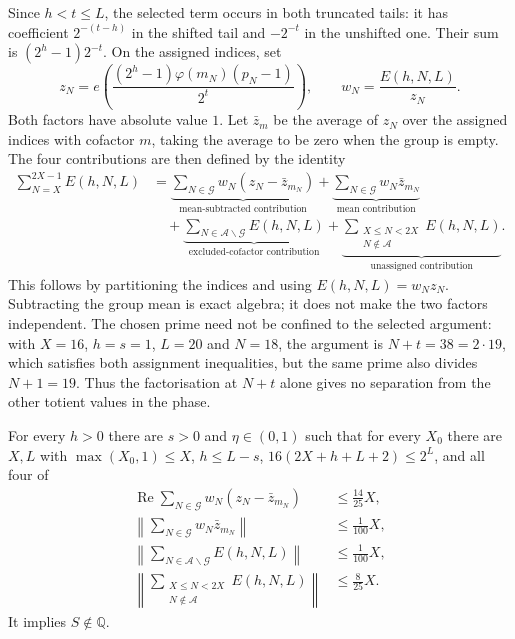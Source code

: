 Since $h<t\le L$, the selected term occurs in both truncated tails:
it has coefficient $2^{-(t-h)}$ in the shifted tail and $-2^{-t}$ in
the unshifted one. Their sum is $(2^h-1)2^{-t}$. On the assigned indices,
set
\[
 z_N=e\!\left(\frac{(2^h-1)\varphi(m_N)(p_N-1)}{2^t}\right),
 \qquad w_N=\frac{E(h,N,L)}{z_N}.
\]
Both factors have absolute value $1$. Let $\bar z_m$ be the average of
$z_N$ over the assigned indices with cofactor $m$, taking the average to
be zero when the group is empty. The four contributions are then defined
by the identity
\[
\begin{aligned}
 \sum_{N=X}^{2X-1}E(h,N,L)
 &=\underbrace{\sum_{N\in\mathcal G}w_N(z_N-\bar z_{m_N})}
                 _{\text{mean-subtracted contribution}}
   +\underbrace{\sum_{N\in\mathcal G}w_N\bar z_{m_N}}
                 _{\text{mean contribution}}\\
 &\quad+\underbrace{\sum_{N\in\mathcal A\smallsetminus\mathcal G}E(h,N,L)}
                 _{\text{excluded-cofactor contribution}}
   +\underbrace{\sum_{\substack{X\le N<2X\\N\notin\mathcal A}}E(h,N,L)}
                 _{\text{unassigned contribution}}.
\end{aligned}
\]
This follows by partitioning the indices and using $E(h,N,L)=w_Nz_N$.
Subtracting the group mean is exact algebra; it does not make the two
factors independent. The chosen prime need not be confined to the selected
argument: with $X=16$, $h=s=1$, $L=20$ and $N=18$, the argument is
$N+t=38=2\cdot19$, which satisfies both assignment inequalities, but the
same prime also divides $N+1=19$. Thus the factorisation at $N+t$ alone
gives no separation from the other totient values in the phase.


\begin{defn}
\label{defn:pivot}
For every $h > 0$ there are $s > 0$ and $\eta \in (0,1)$ such that for every
$X_0$ there are $X, L$ with $\max(X_0,1) \le X$, $h \le L - s$,
$16(2X{+}h{+}L{+}2) \le 2^{L}$, and all four of
\[
\begin{aligned}
 \operatorname{Re}\sum_{N\in\mathcal G}w_N(z_N-\bar z_{m_N})
   &\le \tfrac{14}{25}X,\\
 \left\lVert\sum_{N\in\mathcal G}w_N\bar z_{m_N}\right\rVert
   &\le \tfrac{1}{100}X,\\
 \left\lVert\sum_{N\in\mathcal A\smallsetminus\mathcal G}E(h,N,L)\right\rVert
   &\le \tfrac{1}{100}X,\\
 \left\lVert\sum_{\substack{X\le N<2X\\N\notin\mathcal A}}E(h,N,L)\right\rVert
   &\le \tfrac{8}{25}X.
\end{aligned}
\]
It implies $S\notin\mathbb Q$.
\end{defn}

